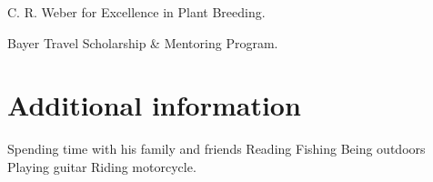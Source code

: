 \documentclass[]{mdkrause_cv_openfont}
\begin{document}
\begin{minipage}[t]{1\textwidth}
\sectionsep

\begin{tightemize}
	\item {} C. R. Weber for Excellence in Plant Breeding.
	\item {} Bayer Travel Scholarship \& Mentoring Program.
\end{tightemize}

\vspace{3 mm}

\section{Additional information}

\sectionsep

Spending time with his family and friends \textbullet{} Reading \textbullet{} Fishing \textbullet{} Being outdoors \textbullet{} Playing guitar \textbullet{} Riding motorcycle. \\

\sectionsep
{}

\sectionsep



\end{minipage}
\end{document}
